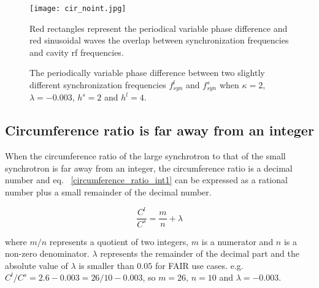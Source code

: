 \begin{figure}[!htb]
   \centering   
   \texttt{[image: cir\_noint.jpg]}
   \caption{The periodically variable phase difference between two slightly different synchronization frequencies $f_{\mathit{syn}}^{l}$ and $f_{\mathit{syn}}^{s}$ when $\kappa=2$, $\lambda=-0.003$, $h^s=2$ and $h^l=4$.}{Red rectangles represent the periodical variable phase difference and red sinusoidal waves the overlap between synchronization frequencies and cavity rf frequencies.}
   \label{cir_noint}
\end{figure} 

%

\subsection{Circumference ratio is far away from an integer}
When the circumference ratio of the large synchrotron to that of the small synchrotron is far away from an integer, the circumference ratio is a decimal number and eq. ~\ref{circumference_ratio_int1} can be expressed as a rational number plus a small remainder of the decimal number.

\begin{equation}
\frac{C^l}{C^s}=\frac{m}{n}+ \lambda \label{circumference_ratio_noint11}
\end{equation}

where $m/n$ represents a quotient of two integers, $m$ is a numerator and $n$ is a non-zero denominator.  $\lambda$ represents the remainder of the decimal part and the absolute value of $\lambda$ is smaller than $0.05$ for FAIR use cases. e.g. $C^l/C^s=2.6-0.003=26/10-0.003$, so $m=26$, $n=10$ and $\lambda=-0.003$. 

